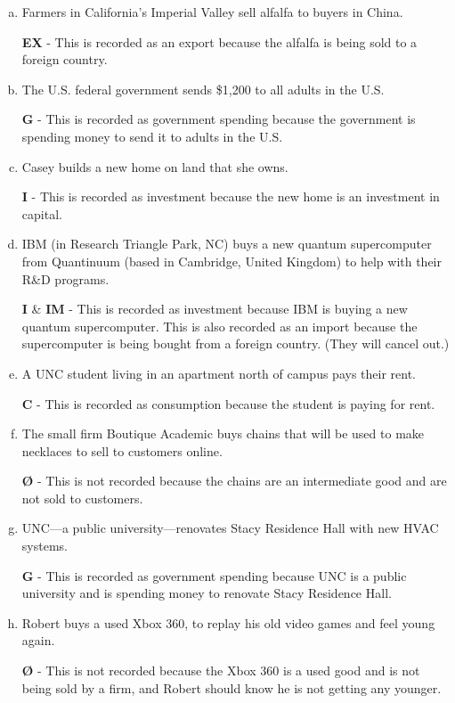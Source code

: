 \documentclass{article}
\begin{document}
\begin{enumerate}[(a)]
    \item Farmers in California's Imperial Valley sell alfalfa to buyers in China.
    
    \textbf{EX} - This is recorded as an export because the alfalfa is being sold to a foreign country.

    \item The U.S. federal government sends \$1,200 to all adults in the U.S.
    
    \textbf{G} - This is recorded as government spending because the government is spending money to send it to adults in the U.S.

    \item Casey builds a new home on land that she owns.
    
    \textbf{I} - This is recorded as investment because the new home is an investment in capital.

    \item IBM (in Research Triangle Park, NC) buys a new quantum supercomputer from Quantinuum (based in Cambridge, United Kingdom) to help with their R\&D programs.

    \textbf{I} \& \textbf{IM} - This is recorded as investment because IBM is buying a new quantum supercomputer. This is also recorded as an import because the supercomputer is being bought from a foreign country. (They will cancel out.)

    \item A UNC student living in an apartment north of campus pays their rent.
    
    \textbf{C} - This is recorded as consumption because the student is paying for rent.

    \item The small firm Boutique Academic buys chains that will be used to make necklaces to sell to customers online.
    
    \textbf{Ø} - This is not recorded because the chains are an intermediate good and are not sold to customers.

    \item UNC—a public university—renovates Stacy Residence Hall with new HVAC systems.
    
    \textbf{G} - This is recorded as government spending because UNC is a public university and is spending money to renovate Stacy Residence Hall.

    \item Robert buys a used Xbox 360, to replay his old video games and feel young again.
    
    \textbf{Ø} - This is not recorded because the Xbox 360 is a used good and is not being sold by a firm, and Robert should know he is not getting any younger.

\end{enumerate}
\end{document}
